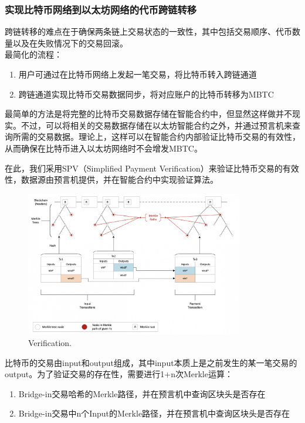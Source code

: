 \documentclass{article}
\begin{document}
\subsubsection{实现比特币网络到以太坊网络的代币跨链转移}
\par 跨链转移的难点在于确保两条链上交易状态的一致性，其中包括交易顺序、代币数量以及在失败情况下的交易回滚。\\
最简化的流程：
\begin{enumerate}
    \item 用户可通过在比特币网络上发起一笔交易，将比特币转入跨链通道
    \item 跨链通道实现比特币交易数据同步，将对应账户的比特币转移为MBTC
\end{enumerate}
\par 最简单的方法是将完整的比特币交易数据存储在智能合约中，但显然这样做并不现实。不过，可以将相关的交易数据存储在以太坊智能合约之外，并通过预言机来查询所需的交易数据。理论上，这样可以在智能合约内部验证比特币交易的有效性，从而确保在比特币进入以太坊网络时不会增发MBTC。
\par 在此，我们采用SPV（Simplified Payment Verification）来验证比特币交易的有效性，数据源由预言机提供，并在智能合约中实现验证算法。
\begin{figure}[h]
\centering
\includegraphics[width=0.85\textwidth]{spv2.png}
\caption{\label{fig:spv2}Verification.}
\end{figure}
\par 比特币的交易由input和output组成，其中input本质上是之前发生的某一笔交易的output。为了验证交易的存在性，需要进行1+n次Merkle运算：
\begin{enumerate}
    \item Bridge-in交易哈希的Merkle路径，并在预言机中查询区块头是否存在
    \item Bridge-in交易中n个Input的Merkle路径，并在预言机中查询区块头是否存在
\end{enumerate}
\end{document}

